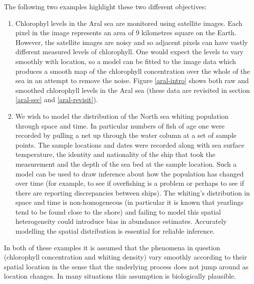 The following two examples highlight these two different objectives:
\begin{enumerate}
\item Chlorophyl levels in the Aral sea are monitored using satellite images. Each pixel in the image represents an area of 9 kilometres square on the Earth. However, the satellite images are noisy and so adjacent pixels can have vastly different measured levels of chlorophyll. One would expect the levels to vary smoothly with location, so a model can be fitted to the image data which produces a smooth map of the chlorophyll concentration over the whole of the sea in an attempt to remove the noise. Figure \ref{aral-intro} shows both raw and smoothed chlorophyll levels in the Aral sea (these data are revisited in section \ref{aral-sec} and \ref{aral-revisit}).
\item We wish to model the distribution of the North sea whiting population through space and time. In particular numbers of fish of age one were recorded by pulling a net up through the water column at a set of sample points. The sample locations and dates were recorded along with sea surface temperature, the identity and nationality of the ship that took the measurement and the depth of the sea bed at the sample location. Such a model can be used to draw inference about how the population has changed over time (for example, to see if overfishing is a problem or perhaps to see if there are reporting discrepancies between ships). The whiting's distribution in space and time is non-homogeneous (in particular it is known that yearlings tend to be found close to the shore) and failing to model this spatial heterogeneity could introduce  bias in abundance estimates. Accurately modelling the spatial distribution is essential for reliable inference.
\end{enumerate}
In both of these examples it is assumed that the phenomena in question (chlorophyll concentration and whiting density) vary smoothly according to their spatial location in the sense that the underlying process does not jump around as location changes. In many situations this assumption is biologically plausible.

